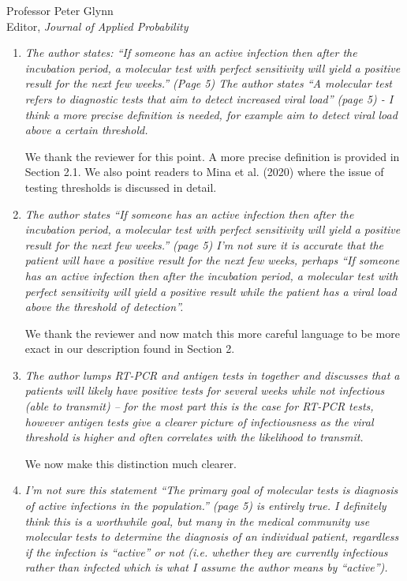 \documentclass[11pt]{letter} %
\begin{document}
\begin{letter}{Professor
	Peter Glynn\\
	Editor, {\em Journal of Applied Probability}}
\begin{enumerate}
\vspace{5mm}
\item {\it The author states: “If someone has an active infection then after the incubation period, a molecular test with perfect sensitivity will yield a positive result for the next few weeks.” (Page 5) The author states “A molecular test refers to diagnostic tests that aim to detect increased viral load” (page 5) - I think a more precise definition is needed, for example aim to detect viral load above a certain threshold.}
\vspace{5mm}

We thank the reviewer for this point. A more precise definition is provided in Section 2.1.  We also point readers to Mina et al. (2020) where the issue of testing thresholds is discussed in detail.

\vspace{5mm}
\item {\it The author states “If someone has an active infection then after the incubation period, a molecular test with perfect sensitivity will yield a positive result for the next few weeks.” (page 5) I’m not sure it is accurate that the patient will have a positive result for the next few weeks, perhaps “If someone has an active infection then after the incubation period, a molecular test with perfect sensitivity will yield a positive result while the patient has a viral load above the threshold of detection”.}
\vspace{5mm}

We thank the reviewer and now match this more careful language to be more exact in our description found in Section 2.
\vspace{5mm}
\item {\it The author lumps RT-PCR and antigen tests in together and discusses that a patients will likely have positive tests for several weeks while not infectious (able to transmit) – for the most part this is the case for RT-PCR tests, however antigen tests give a clearer picture of infectiousness as the viral threshold is higher and often correlates with the likelihood to transmit.}

\vspace{5mm}
We now make this distinction much clearer.
\vspace{5mm}

\item {\it I’m not sure this statement “The primary goal of molecular tests is diagnosis of active infections in the population.” (page 5) is entirely true. I definitely think this is a worthwhile goal, but many in the medical community use molecular tests to determine the diagnosis of an individual patient, regardless if the infection is “active” or not (i.e. whether they are currently infectious rather than infected which is what I assume the author means by “active”).}


\end{enumerate}
\end{letter}
\end{document}
